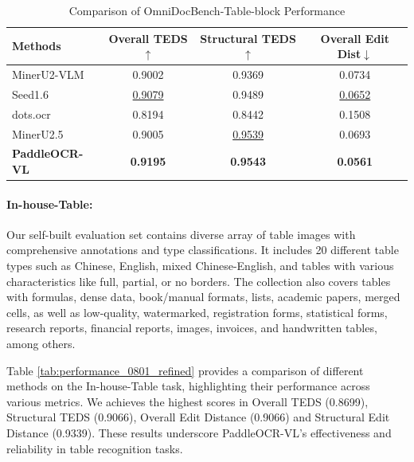 \documentclass[11pt, a4paper,logo,  copyright, nonumbering]{paddleocr}
\begin{document}
\begin{table}[H] 
    \centering
\fontsize{7}{7}\selectfont

    \setlength{\tabcolsep}{6pt} %
      \renewcommand{\arraystretch}{1.2}
    \begin{tabular}{l|ccc}
\toprule[.9pt]
\textbf{Methods} & \textbf{Overall TEDS$\uparrow$} & \textbf{Structural TEDS$\uparrow$} & \textbf{Overall Edit Dist$\downarrow$} \\
\midrule
MinerU2-VLM~\cite{MinerU2} &0.9002 &0.9369 &0.0734 \\

Seed1.6 &\cellcolor{cyan!15}\underline{0.9079}  &0.9489 &\cellcolor{cyan!15}\underline{0.0652}  \\

dots.ocr~\cite{dotsocr} &0.8194 &0.8442 &0.1508 \\

MinerU2.5~\cite{niu2025mineru2} &0.9005 &\cellcolor{cyan!15}\underline{0.9539} &0.0693 \\

\textbf{PaddleOCR-VL} &\cellcolor{red!15}\textbf{0.9195} &\cellcolor{red!15}\textbf{0.9543} &\cellcolor{red!15}\textbf{0.0561} \\

\bottomrule
\end{tabular}
\caption{Comparison of OmniDocBench-Table-block Performance}
\label{result_on_omnidoc_table_v1_5}
\end{table}


\paragraph{In-house-Table:} Our self-built evaluation set contains diverse array of table images with comprehensive annotations and type classifications. It includes 20 different table types such as Chinese, English, mixed Chinese-English, and tables with various characteristics like full, partial, or no borders. The collection also covers tables with formulas, dense data, book/manual formats, lists, academic papers, merged cells, as well as low-quality, watermarked, registration forms, statistical forms, research reports, financial reports, images, invoices, and handwritten tables, among others.

Table \ref{tab:performance_0801_refined} provides a comparison of different methods on the In-house-Table task, highlighting their performance across various metrics. We achieves the highest scores in Overall TEDS (0.8699), Structural TEDS (0.9066), Overall Edit Distance (0.9066) and Structural Edit Distance (0.9339). These results underscore PaddleOCR-VL's effectiveness and reliability in table recognition tasks.
\end{document}
